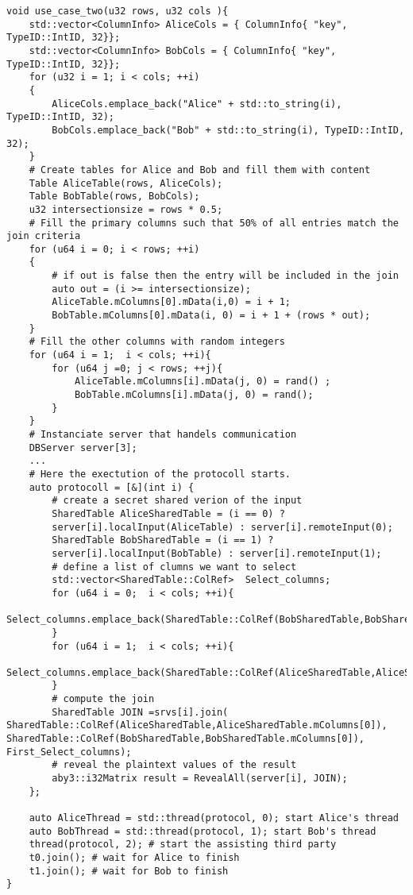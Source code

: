 \begin{lstlisting}[caption={Simpifiyed Protocol for our first use-case in ABY3}]
void use_case_two(u32 rows, u32 cols ){
	std::vector<ColumnInfo> AliceCols = { ColumnInfo{ "key", TypeID::IntID, 32}};
	std::vector<ColumnInfo> BobCols = { ColumnInfo{ "key", TypeID::IntID, 32}};
	for (u32 i = 1; i < cols; ++i)
	{
		AliceCols.emplace_back("Alice" + std::to_string(i), TypeID::IntID, 32);
		BobCols.emplace_back("Bob" + std::to_string(i), TypeID::IntID, 32);
	}
	# Create tables for Alice and Bob and fill them with content
	Table AliceTable(rows, AliceCols);
	Table BobTable(rows, BobCols);
	u32 intersectionsize = rows * 0.5;
	# Fill the primary columns such that 50% of all entries match the join criteria 
	for (u64 i = 0; i < rows; ++i)
	{
		# if out is false then the entry will be included in the join
		auto out = (i >= intersectionsize);
		AliceTable.mColumns[0].mData(i,0) = i + 1;
		BobTable.mColumns[0].mData(i, 0) = i + 1 + (rows * out);
	}
	# Fill the other columns with random integers
	for (u64 i = 1;  i < cols; ++i){
		for (u64 j =0; j < rows; ++j){
			AliceTable.mColumns[i].mData(j, 0) = rand() ;
			BobTable.mColumns[i].mData(j, 0) = rand();	
		}
	}
	# Instanciate server that handels communication
	DBServer server[3]; 
	...
	# Here the exectution of the protocoll starts.
	auto protocoll = [&](int i) {
		# create a secret shared verion of the input
		SharedTable AliceSharedTable = (i == 0) ? 
		server[i].localInput(AliceTable) : server[i].remoteInput(0);
		SharedTable BobSharedTable = (i == 1) ?
		server[i].localInput(BobTable) : server[i].remoteInput(1);
		# define a list of clumns we want to select
		std::vector<SharedTable::ColRef>  Select_columns;		
		for (u64 i = 0;  i < cols; ++i){
			Select_columns.emplace_back(SharedTable::ColRef(BobSharedTable,BobSharedTable.mColumns[i]));
		}
		for (u64 i = 1;  i < cols; ++i){
			Select_columns.emplace_back(SharedTable::ColRef(AliceSharedTable,AliceSharedTable.mColumns[i]));
		}
		# compute the join
		SharedTable JOIN =srvs[i].join( SharedTable::ColRef(AliceSharedTable,AliceSharedTable.mColumns[0]), SharedTable::ColRef(BobSharedTable,BobSharedTable.mColumns[0]), First_Select_columns);
		# reveal the plaintext values of the result
		aby3::i32Matrix result = RevealAll(server[i], JOIN); 
	};
	
	auto AliceThread = std::thread(protocol, 0); start Alice's thread
	auto BobThread = std::thread(protocol, 1); start Bob's thread
	thread(protocol, 2); # start the assisting third party
	t0.join(); # wait for Alice to finish
	t1.join(); # wait for Bob to finish
}

\end{lstlisting}
